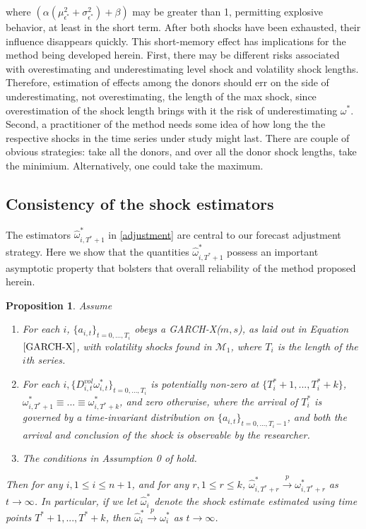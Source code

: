 \documentclass[11pt,3p,review,authoryear]{elsarticle}
\def\mc#1{\mathcal{#1}} %
\def\mc#1{\mathcal{#1}}
\newtheorem{prop}{Proposition}
\theoremstyle{definition}
\begin{document}
where $(\alpha(\mu^{2}_{\epsilon^{*}} + \sigma^{2}_{\epsilon^{*}}) + \beta)$ may be greater than 1, permitting explosive behavior, at least in the short term.  After both shocks have been exhausted, their influence disappears quickly.  This short-memory effect has implications for the method being developed herein.  First, there may be different risks associated with overestimating and underestimating level shock and volatility shock lengths.  Therefore, estimation of effects among the donors should err on the side of underestimating, not overestimating, the length of the max shock, since overestimation of the shock length brings with it the risk of underestimating $\omega^{*}$.  Second, a practitioner of the method needs some idea of how long the the respective shocks in the time series under study might last.  There are couple of obvious strategies: take all the donors, and over all the donor shock lengths, take the minimium.  Alternatively, one could take the maximum.

\subsection{Consistency of the shock estimators}

The estimators $\hat\omega^{*}_{i,T^{*}+1}$ in \eqref{adjustment} are central to our forecast adjustment strategy.  Here we show that the quantities $\hat\omega^{*}_{i,T^{*}+1}$ possess an important asymptotic property that bolsters that overall reliability of the method proposed herein.

\begin{prop}\label{omega_consistency}
Assume
\begin{enumerate}
  \item For each $i$, $\{a_{i,t}\}_{t=0,...,T_i}$ obeys a GARCH-X($m,s$), as laid out in Equation $\eqref{GARCH-X}$, with volatility shocks found in $\mc{M}_{1}$, where $T_i$ is the length of the $i$th series.
  \item For each $i, \{D^{vol}_{i,t}\omega_{i,t}^{*}\}_{t=0,...,T_i}$ is potentially non-zero at $\{T^{*}_{i}+1,... ,T^{*}_{i}+k\}$, $\omega_{i,T^{*}+1}^{*}\equiv...\equiv\omega_{i,T^{*}+k}^{*}$, and zero otherwise, where the arrival of $T_{i}^{*}$ is governed by a time-invariant distribution on $\{a_{i,t}\}_{t=0,...,T_i-1}$, and both the arrival and conclusion of the shock is observable by the researcher. \label{stationarity_of_omega_i_t}
  \item The conditions in Assumption 0 of \citet{han2014asymptotic} hold.
\end{enumerate}
Then for any $i, 1\leq i \leq n+1$, and for any $r, 1\leq r \leq k$, $\hat\omega_{i,T^{*}+r}^{*} \overset{p}{\longrightarrow} \omega_{i,T^{*}+r}^{*}$ as $t\rightarrow\infty$.  In particular, if we let $\hat\omega_{i}^{*}$ denote the shock estimate estimated using time points $T^{*}+1,...,T^{*}+k$, then $\hat\omega_{i}^{*} \overset{p}{\longrightarrow} \omega_{i}^{*}$ as $t\rightarrow\infty$.
\end{prop}
\end{document}
